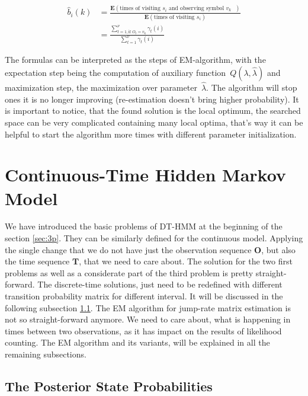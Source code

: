\documentclass[thesis=M,english]{FITthesis}[2012/10/20]
\newcommand{\matr}[1]{\mathbf{#1}}
\begin{document}
\begin{equation}\label{eq:bwb}
\begin{aligned}
\hat b_{i}(k) &= \frac{\mathbf{E}(\text{times of visiting $s_i$ and observing symbol $v_k$ })}
				   {\mathbf{E}(\text{times of visiting $s_i$})} \\
			  &= \frac{\sum\limits_{t=1, \text{if } O_t = v_k  }^{\nu} \gamma_t(i)}{\sum\limits_{t=1}^{\nu} \gamma_t(i) } 
\end{aligned}
\end{equation}

The formulas can be interpreted as the steps of EM-algorithm, with the expectation step being the computation of auxiliary function~$Q(\lambda,\hat\lambda)$ and maximization step, the maximization over parameter~$\hat\lambda$. The algorithm will stop ones it is no longer improving (re-estimation doesn't bring higher probability). It is important to notice, that the found solution is the local optimum, the searched space can be very complicated containing many local optima, that's way it can be helpful to start the algorithm more times with different parameter initialization.  


\section{Continuous-Time Hidden Markov Model}

We have introduced the basic problems of DT-HMM at the beginning of the section \ref{sec:3p}. They can be similarly defined for the continuous model. Applying the single change that we do not have just the observation sequence $\matr{O}$, but also the time sequence $\matr{T}$, that we need to care about. The solution for the two first problems as well as a considerate part of the third problem is pretty straight-forward. The discrete-time solutions, just need to be redefined with different transition probability matrix for different interval. It will be discussed in the following subsection \ref{sec:pos}. The EM algorithm for jump-rate matrix estimation is not so straight-forward anymore. We need to care about, what is happening in times between two observations, as it has impact on the results of likelihood counting. The EM algorithm and its variants, will be explained in all the remaining subsections.   


\subsection{The Posterior State Probabilities}\label{sec:pos}
\end{document}
